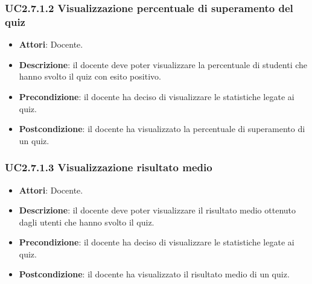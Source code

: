 \subsubsection{UC2.7.1.2 Visualizzazione percentuale di superamento del quiz}
\begin{itemize}
\item \textbf{Attori}: Docente.
\item \textbf{Descrizione}: il docente deve poter visualizzare la percentuale di studenti che hanno svolto il quiz con esito positivo.
\item \textbf{Precondizione}: il docente ha deciso di visualizzare le statistiche legate ai quiz.
\item \textbf{Postcondizione}: il docente ha visualizzato la percentuale di superamento di un quiz.
\end{itemize}
\subsubsection{UC2.7.1.3 Visualizzazione risultato medio}
\begin{itemize}
\item \textbf{Attori}: Docente.
\item \textbf{Descrizione}: il docente deve poter visualizzare il risultato medio ottenuto dagli utenti che hanno svolto il quiz.
\item \textbf{Precondizione}: il docente ha deciso di visualizzare le statistiche legate ai quiz.
\item \textbf{Postcondizione}: il docente ha visualizzato il risultato medio di un quiz.
\end{itemize}
